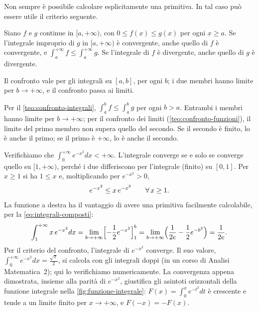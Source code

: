 Non sempre è possibile calcolare esplicitamente una primitiva. In tal caso può essere
utile il criterio seguente.

\begin{teorema}\label{teo:confronto-impropri}
Siano $f$ e $g$ continue in $[a,+\infty)$, con $0\le f(x)\le g(x)$ per ogni $x\ge a$. Se
l'integrale improprio di $g$ in $[a,+\infty)$ è convergente, anche quello di $f$ è
convergente, e $\int_{a}^{+\infty}f\le\int_{a}^{+\infty}g$. Se l'integrale di $f$ è divergente, anche
quello di $g$ è divergente.
\end{teorema}

\begin{schema}
\Ipotesi{$f$, $g$ continue in $[a,+\infty)$; \ $0\le f\le g$.}
\end{schema}

\begin{strategia}
Il confronto vale per gli integrali su $[a,b]$, per ogni $b$; i due membri hanno limite per
$b\to+\infty$, e il confronto passa ai limiti.
\end{strategia}

\begin{dimostrazione}
Per il \cref{teo:confronto-integrali}, $\int_{a}^{b}f\le\int_{a}^{b}g$ per ogni $b>a$. Entrambi i membri
hanno limite per $b\to+\infty$; per il confronto dei limiti (\cref{teo:confronto-funzioni}),
il limite del primo membro non supera quello del secondo. Se il secondo è finito, lo è
anche il primo; se il primo è $+\infty$, lo è anche il secondo.
\end{dimostrazione}

\begin{esempio}\label{es:gauss-converge}
Verifichiamo che $\int_{0}^{+\infty}e^{-x^{2}}dx<+\infty$. L'integrale converge se e solo se converge
quello su $[1,+\infty)$, perché i due differiscono per l'integrale (finito) su $[0,1]$. Per
$x\ge1$ si ha $1\le x$ e, moltiplicando per $e^{-x^{2}}>0$,
\[
  e^{-x^{2}}\le x\,e^{-x^{2}} \qquad\forall\, x\ge1 .
\]
La funzione a destra ha il vantaggio di avere una primitiva facilmente calcolabile, per
la \eqref{eq:integrali-composti}:
\[
  \int_{1}^{+\infty}x\,e^{-x^{2}}dx=\lim_{b\to+\infty}\Bigl[-\frac12e^{-x^{2}}\Bigr]_{1}^{b}
  =\lim_{b\to+\infty}\Bigl(\frac1{2e}-\frac12e^{-b^{2}}\Bigr)=\frac1{2e} .
\]
Per il criterio del confronto, l'integrale di $e^{-x^{2}}$ converge. Il suo valore,
$\int_{0}^{+\infty}e^{-x^{2}}dx=\frac{\sqrt\pi}2$, si calcola con gli integrali doppi (in un corso di Analisi
Matematica~2); qui lo verifichiamo numericamente. La convergenza appena dimostrata,
insieme alla parità di $e^{-x^{2}}$, giustifica gli asintoti orizzontali della funzione
integrale nella \cref{fig:funzione-integrale}: $F(x)=\int_{0}^{x}e^{-t^{2}}dt$ è crescente e
tende a un limite finito per $x\to+\infty$, e $F(-x)=-F(x)$.
\end{esempio}

